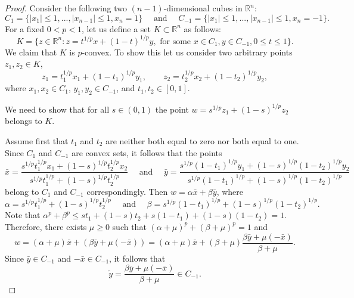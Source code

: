 \documentclass[12pt]{amsart} %
\renewcommand{\[}{\left[}
\renewcommand{\(}{\left(}
\renewcommand{\]}{\right]}
\renewcommand{\)}{\right)}
\renewcommand{\le}{\leqslant}
\renewcommand{\ge}{\geqslant}
\begin{document}
\begin{proof}


Consider the following two $(n-1)$-dimensional cubes in $\mathbb R^{n}$:
$$C_1=\{|x_1|\le 1, ...,|x_{n-1}|\le 1, x_{n}=1\} \,\,\,\,\,\,  \mbox{  and  } \,\,\,\,\,\, C_{-1}=\{|x_1|\le 1, ...,|x_{n-1}|\le 1, x_{n}=-1\}.$$
For a fixed $0<p<1$, let us define  a set $K\subset \mathbb R^{n}$ as follows:
$$
K = \{z\in \mathbb R^n :  z= t^{1/p}x+ (1-t)^{1/p}y, \mbox{ for some }  x\in C_{1}, y\in C_{-1},  0\le t\le 1\}.
$$
We claim that $K$ is $p$-convex. To show this let us consider two arbitrary points $z_1, z_2\in K$,
$$z_1= t_1^{1/p}x_1+ (1-t_1)^{1/p}y_1,\qquad z_2= t_2^{1/p}x_2+ (1-t_2)^{1/p}y_2,$$ where $x_1, x_2\in C_{1}$, $y_1, y_2\in C_{-1}$, and $t_1, t_2 \in [0, 1]$.

We need to show that for all $s\in (0,1)$ the point  $w= s^{1/p}z_1+ (1-s)^{1/p}z_2$ belongs to $K$.


Assume first that $t_1$ and $t_2$ are  neither both   equal to   zero  nor both equal to one.
Since $C_1$ and $C_{-1}$ are convex sets, it follows that the points
$${\bar x} = \frac{s^{1/p}t_1^{1/p}x_1+ (1-s)^{1/p}t_2^{1/p}x_2}{s^{1/p}t_1^{1/p} + (1-s)^{1/p}t_2^{1/p}}
\,\,\,\,\,\,\mbox{  and   }\,\,\,\,\,\,
{\bar y} =\frac{s^{1/p} (1-t_1)^{1/p}y_1+  (1-s)^{1/p}(1-t_2)^{1/p}y_2}{s^{1/p} (1-t_1)^{1/p}+  (1-s)^{1/p}(1-t_2)^{1/p}}$$
belong to $C_1$ and $C_{-1}$ correspondingly. Then $w=  \alpha {\bar x} + \beta {\bar y}$,  where $$\alpha = s^{1/p}t_1^{1/p} + (1-s)^{1/p}t_2^{1/p} \,\,\,\,\,\,  \mbox {   and }\,\,\,\,\,\,   \beta =s^{1/p} (1-t_1)^{1/p}+  (1-s)^{1/p}(1-t_2)^{1/p}.
$$
Note that $\alpha^p +\beta^p \le s t_1  + (1-s) t_2 + s  (1-t_1) +  (1-s) (1-t_2) = 1.$
Therefore, there exists $\mu\ge 0$ such that $(\alpha+\mu)^p+(\beta+\mu)^p =1$ and
 $$w=  (\alpha+\mu) {\bar x} + (\beta {\bar y}+\mu (-{\bar x})) = (\alpha+\mu) {\bar x} + (\beta+\mu)\frac{\beta {\bar y}+\mu (-{\bar x})}{\beta +\mu}.$$
 Since ${\bar y}\in C_{-1}$ and $-{\bar x}\in C_{-1}$, it follows that $${\widetilde y} = \frac{\beta {\bar y}+\mu (-{\bar x})}{\beta +\mu}\in C_{-1}.$$


\end{proof}
\end{document}
